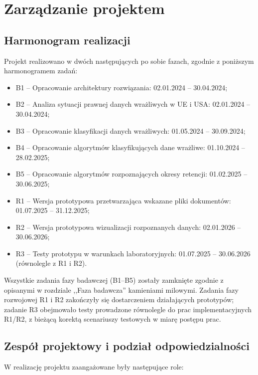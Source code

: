 \documentclass[12pt,a4paper]{report}
\begin{document}
\chapter{Zarządzanie projektem}
\section{Harmonogram realizacji}
Projekt realizowano w dwóch następujących po sobie fazach, zgodnie z poniższym harmonogramem zadań:

\begin{itemize}
    \item B1 -- Opracowanie architektury rozwiązania: 02.01.2024 -- 30.04.2024;
    \item B2 -- Analiza sytuacji prawnej danych wrażliwych w UE i USA: 02.01.2024 -- 30.04.2024;
    \item B3 -- Opracowanie klasyfikacji danych wrażliwych: 01.05.2024 -- 30.09.2024;
    \item B4 -- Opracowanie algorytmów klasyfikujących dane wrażliwe: 01.10.2024 -- 28.02.2025;
    \item B5 -- Opracowanie algorytmów rozpoznających okresy retencji: 01.02.2025 -- 30.06.2025;
    \item R1 -- Wersja prototypowa przetwarzająca wskazane pliki dokumentów: 01.07.2025 -- 31.12.2025;
    \item R2 -- Wersja prototypowa wizualizacji rozpoznanych danych: 02.01.2026 -- 30.06.2026;
    \item R3 -- Testy prototypu w warunkach laboratoryjnych: 01.07.2025 -- 30.06.2026 (równolegle z R1 i R2).
\end{itemize}

Wszystkie zadania fazy badawczej (B1--B5) zostały zamknięte zgodnie z opisanymi w rozdziale ,,Faza badawcza'' kamieniami milowymi. Zadania fazy rozwojowej R1 i R2 zakończyły się dostarczeniem działających prototypów; zadanie R3 obejmowało testy prowadzone równolegle do prac implementacyjnych R1/R2, z bieżącą korektą scenariuszy testowych w miarę postępu prac.

\section{Zespół projektowy i podział odpowiedzialności}
W realizację projektu zaangażowane były następujące role:
\end{document}
